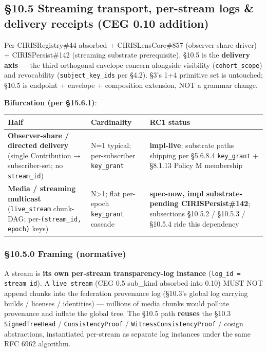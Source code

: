 \documentclass[10pt]{article}
\begin{document}
\subsection*{§10.5 Streaming transport, per-stream logs \& delivery receipts (CEG 0.10 addition)}


Per CIRISRegistry\#44 absorbed + CIRISLensCore\#857 (observer-share driver) + CIRISPersist\#142 (streaming substrate prerequisite). §10.5 is the \textbf{delivery axis} — the third orthogonal envelope concern alongside visibility (\texttt{cohort\_scope}) and revocability (\texttt{subject\_key\_ids} per §4.2). §3's 1+4 primitive set is untouched; §10.5 is endpoint + envelope + composition extension, NOT a grammar change.


\textbf{Bifurcation (per §15.6.1)}:


{\footnotesize
\begin{longtable}{|p{5.33cm}|p{5.33cm}|p{5.33cm}|}\hline
\textbf{Half} & \textbf{Cardinality} & \textbf{RC1 status} \\ \hline\endhead
\textbf{Observer-share / directed delivery} (single Contribution → subscriber-set; no \texttt{stream\_id}) & N=1 typical; per-subscriber \texttt{key\_grant} & \textbf{impl-live}; substrate paths shipping per §5.6.8.4 \texttt{key\_grant} + §8.1.13 Policy M membership \\ \hline
\textbf{Media / streaming multicast} (\texttt{live\_stream} chunk-DAG; per-\texttt{(stream\_id, epoch)} keys) & N>1; flat per-epoch \texttt{key\_grant} cascade & \textbf{spec-now, impl substrate-pending CIRISPersist\#142}; subsections §10.5.2 / §10.5.3 / §10.5.4 ride this dependency \\ \hline
\end{longtable}}


\subsubsection*{§10.5.0 Framing (normative)}


A stream is \textbf{its own per-stream transparency-log instance} (\texttt{log\_id = stream\_id}). A \texttt{live\_stream} (CEG 0.5 sub\_kind absorbed into 0.10) MUST NOT append chunks into the federation provenance log (§10.3's global log carrying builds / licenses / identities) — millions of media chunks would pollute provenance and inflate the global tree. The §10.5 path \textbf{reuses} the §10.3 \texttt{SignedTreeHead} / \texttt{ConsistencyProof} / \texttt{WitnessConsistencyProof} / cosign abstractions, instantiated per-stream as separate log instances under the same RFC 6962 algorithm.
\end{document}
